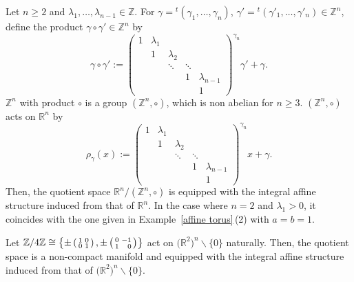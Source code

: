 \documentclass[pdftex]{sigma}
\numberwithin{equation}{section}
\newcommand{\R}{\mathbb{R}}
\newcommand{\Z}{\mathbb{Z}}
\renewcommand{\setminus}{\smallsetminus}
\begin{document}
\begin{Example}\label{Jordan block}
Let $n\ge 2$ and $\lambda_1,\ldots, \lambda_{n-1}\in \Z$. For $\gamma={}^t(\gamma_1, \ldots, \gamma_n)$, $\gamma'={}^t(\gamma'_1, \ldots, \gamma'_n)\in \Z^n$, define the product $\gamma\circ \gamma' \in \Z^n$ by
\[
\gamma\circ \gamma' :=
\begin{pmatrix}
1 & \lambda_1 & & & \\
 & 1 & \lambda_2 & & \\
 & & \ddots & \ddots & \\
 & & & 1 & \lambda_{n-1}\\
 & & & & 1
\end{pmatrix}^{\gamma_n}
\gamma'+\gamma.
\]
$\Z^n$ with product $\circ$ is a group $(\Z^n,\circ )$, which is non abelian for $n\ge 3$. $(\Z^n,\circ )$ acts on $\R^n$ by
\[
\rho_\gamma (x):=
\begin{pmatrix}
1 & \lambda_1 & & & \\
 & 1 & \lambda_2 & & \\
 & & \ddots & \ddots & \\
 & & & 1 & \lambda_{n-1}\\
 & & & & 1
\end{pmatrix}^{\gamma_n}
x+\gamma.
\]
Then, the quotient space $\R^n/(\Z^n,\circ )$ is equipped with the integral affine structure induced from that of $\R^n$. In the case where $n=2$ and $\lambda_1>0$, it coincides with the one given in Example~\ref{affine torus}\,(2) with $a=b=1$.
\end{Example}

\begin{Example}\label{incomplete}
Let $\Z /4\Z\cong \left\{
\pm \left(\begin{smallmatrix}
1 & 0 \\
0 & 1
\end{smallmatrix}\right),
\pm \left(\begin{smallmatrix}
0 & -1 \\
1 & \hphantom{-}0
\end{smallmatrix}\right)
\right\}$ act on $\bigl(\R^2\bigr)^n\setminus \{ 0\}$ naturally. Then, the quotient space is a non-compact manifold and equipped with the integral affine structure induced from that of $\bigl(\R^2\bigr)^n\setminus \{0\}$.
\end{Example}
\end{document}
